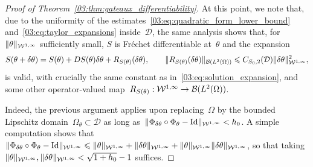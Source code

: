 \begin{proof}[Proof of Theorem~\ref{03:thm:gateaux_differentiability}]
    At this point, we note that, due to the uniformity of the estimates~\eqref{03:eq:quadratic_form_lower_bound} and~\eqref{03:eq:taylor_expansions} inside~$\mathcal D$, the same analysis shows that, for~$\|\theta\|_{{\mathcal{W}}^{1,\infty}}$ sufficiently small,
    $S$ is Fréchet differentiable at~$\theta$ and the expansion
    \begin{equation}
        \label{03:eq:solution_expansion_nonzero}
        S(\theta+\delta\theta) = S(\theta) + D S(\theta)\delta\theta + R_{S(\theta)}(\delta\theta),\qquad \|R_{S(\theta)}(\delta\theta)\|_{\mathcal B(L^2(\Omega))} \leqslant C_{S_0,2}(\mathcal D)\|\delta\theta\|^2_{{\mathcal{W}}^{1,\infty}},
    \end{equation}
    is valid, with crucially the same constant as in~\eqref{03:eq:solution_expansion}, and some other operator-valued map~$R_{S(\theta)}:{\mathcal{W}}^{1,\infty}\to\mathcal B(L^2(\Omega))$.
    
    Indeed, the previous argument applies upon replacing~$\Omega$ by the bounded Lipschitz domain~$\Omega_\theta \subset \mathcal D$ as long as~$\|\Phi_{\delta\theta}\circ \Phi_\theta - \mathrm{Id}\|_{{\mathcal{W}}^{1,\infty}}<h_0$. A simple computation shows that~$\|\Phi_{\delta\theta}\circ \Phi_\theta - \mathrm{Id}\|_{{\mathcal{W}}^{1,\infty}}\leqslant \|\theta\|_{{\mathcal{W}}^{1,\infty}}+\|\delta\theta\|_{{\mathcal{W}}^{1,\infty}}+\|\theta\|_{{\mathcal{W}}^{1,\infty}}\|\delta\theta\|_{{\mathcal{W}}^{1,\infty}}$, so that taking~$\|\theta\|_{{\mathcal{W}}^{1,\infty}},\|\delta\theta\|_{{\mathcal{W}}^{1,\infty}}<\sqrt{1+h_0}-1$ suffices.


\end{proof}
